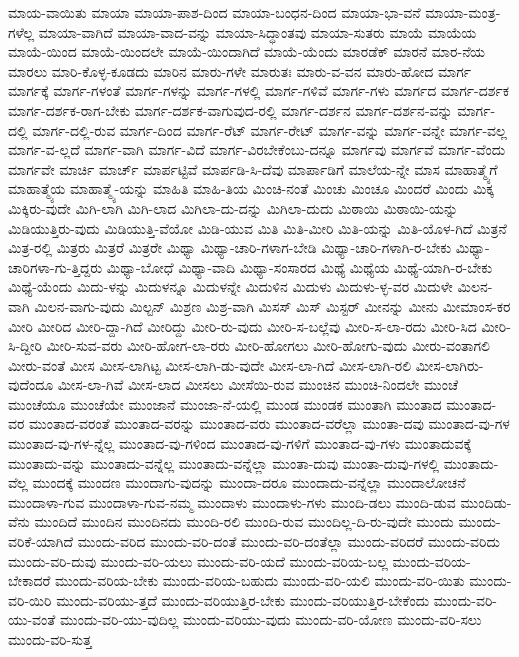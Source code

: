 {ಮಾಯ-ವಾಯಿತು
ಮಾಯಾ
ಮಾಯಾ-ಪಾಶ-ದಿಂದ
ಮಾಯಾ-ಬಂಧನ-ದಿಂದ
ಮಾಯಾ-ಭಾ-ವನೆ
ಮಾಯಾ-ಮಂತ್ರ-ಗಳೆಲ್ಲ
ಮಾಯಾ-ವಾಗಿದೆ
ಮಾಯಾ-ವಾದ-ವನ್ನು
ಮಾಯಾ-ಸಿದ್ಧಾಂತವು
ಮಾಯಾ-ಸುತರು
ಮಾಯೆ
ಮಾಯೆಯ
ಮಾಯೆ-ಯಿಂದ
ಮಾಯೆ-ಯಿಂದಲೇ
ಮಾಯೆ-ಯಿಂದಾಗಿದೆ
ಮಾಯೆ-ಯೆಂದು
ಮಾರಡೆಕ್
ಮಾರನೆ
ಮಾರ-ನೆಯ
ಮಾರಲು
ಮಾರಿ-ಕೊಳ್ಳ-ಕೂಡದು
ಮಾರಿನ
ಮಾರು-ಗಳೇ
ಮಾರುತಃ
ಮಾರು-ವ-ವನ
ಮಾರು-ಹೋದ
ಮಾರ್ಗ
ಮಾರ್ಗಕ್ಕೆ
ಮಾರ್ಗ-ಗಳಂತೆ
ಮಾರ್ಗ-ಗಳನ್ನು
ಮಾರ್ಗ-ಗಳಲ್ಲಿ
ಮಾರ್ಗ-ಗಳಿವೆ
ಮಾರ್ಗ-ಗಳು
ಮಾರ್ಗದ
ಮಾರ್ಗ-ದರ್ಶಕ
ಮಾರ್ಗ-ದರ್ಶಕ-ರಾಗ-ಬೇಕು
ಮಾರ್ಗ-ದರ್ಶಕ-ವಾಗುವುದ-ರಲ್ಲಿ
ಮಾರ್ಗ-ದರ್ಶನ
ಮಾರ್ಗ-ದರ್ಶನ-ವನ್ನು
ಮಾರ್ಗ-ದಲ್ಲಿ
ಮಾರ್ಗ-ದಲ್ಲಿ-ರುವ
ಮಾರ್ಗ-ದಿಂದ
ಮಾರ್ಗ-ರೆಟ್
ಮಾರ್ಗ-ರೇಟ್
ಮಾರ್ಗ-ವನ್ನು
ಮಾರ್ಗ-ವನ್ನೇ
ಮಾರ್ಗ-ವಲ್ಲ
ಮಾರ್ಗ-ವ-ಲ್ಲದೆ
ಮಾರ್ಗ-ವಾಗಿ
ಮಾರ್ಗ-ವಿದೆ
ಮಾರ್ಗ-ವಿರಬೇಕೆಂಬು-ದನ್ನೂ
ಮಾರ್ಗವು
ಮಾರ್ಗವೆ
ಮಾರ್ಗ-ವೆಂದು
ಮಾರ್ಗವೇ
ಮಾರ್ಚಿ
ಮಾರ್ಚ್
ಮಾರ್ಪಟ್ಟಿವೆ
ಮಾರ್ಪಡಿ-ಸಿ-ದೆವು
ಮಾರ್ಪಾಡಿಗೆ
ಮಾಲೆಯ-ನ್ನೇ
ಮಾಸ
ಮಾಹಾತ್ಮ್ಯೆಗೆ
ಮಾಹಾತ್ಮ್ಯೆಯ
ಮಾಹಾತ್ಮ್ಯೆ-ಯನ್ನು
ಮಾಹಿತಿ
ಮಾಹಿ-ತಿಯ
ಮಿಂಚಿ-ನಂತೆ
ಮಿಂಚು
ಮಿಂಚೂ
ಮಿಂದರೆ
ಮಿಂದು
ಮಿಕ್ಕ
ಮಿಕ್ಕಿರು-ವುದೇ
ಮಿಗಿ-ಲಾಗಿ
ಮಿಗಿ-ಲಾದ
ಮಿಗಿಲಾ-ದು-ದನ್ನು
ಮಿಗಿಲಾ-ದುದು
ಮಿಠಾಯಿ
ಮಿಠಾಯಿ-ಯನ್ನು
ಮಿಡಿಯುತ್ತಿರು-ವುದು
ಮಿಡಿಯುತ್ತಿ-ವೆಯೋ
ಮಿಡಿ-ಯುವ
ಮಿತಿ
ಮಿತಿ-ಮೀರಿ
ಮಿತಿ-ಯನ್ನು
ಮಿತಿ-ಯೊಳ-ಗಿದೆ
ಮಿತ್ರನೆ
ಮಿತ್ರ-ರಲ್ಲಿ
ಮಿತ್ರರು
ಮಿತ್ರರೆ
ಮಿತ್ರರೇ
ಮಿಥ್ಯಾ
ಮಿಥ್ಯಾ-ಚಾರಿ-ಗಳಾಗ-ಬೇಡಿ
ಮಿಥ್ಯಾ-ಚಾರಿ-ಗಳಾಗಿ-ರ-ಬೇಕು
ಮಿಥ್ಯಾ-ಚಾರಿಗಳಾ-ಗು-ತ್ತಿದ್ದರು
ಮಿಥ್ಯಾ-ಬೋಧೆ
ಮಿಥ್ಯಾ-ವಾದಿ
ಮಿಥ್ಯಾ-ಸಂಸಾರದ
ಮಿಥ್ಯೆ
ಮಿಥ್ಯೆಯ
ಮಿಥ್ಯೆ-ಯಾಗಿ-ರ-ಬೇಕು
ಮಿಥ್ಯೆ-ಯೆಂದು
ಮಿದು-ಳನ್ನು
ಮಿದುಳನ್ನೂ
ಮಿದುಳನ್ನೇ
ಮಿದುಳಿನ
ಮಿದುಳು
ಮಿದುಳು-ಳ್ಳ-ವರ
ಮಿದುಳೇ
ಮಿಲನ-ವಾಗಿ
ಮಿಲನ-ವಾಗು-ವುದು
ಮಿಲ್ಟನ್
ಮಿಶ್ರಣ
ಮಿಶ್ರ-ವಾಗಿ
ಮಿಸಸ್
ಮಿಸ್
ಮಿಸ್ಟರ್
ಮೀನನ್ನು
ಮೀನು
ಮೀಮಾಂಸ-ಕರ
ಮೀರಿ
ಮೀರಿದ
ಮೀರಿ-ದ್ದಾ-ಗಿದೆ
ಮೀರಿದ್ದು
ಮೀರಿ-ರು-ವುದು
ಮೀರಿ-ಸ-ಬಲ್ಲೆವು
ಮೀರಿ-ಸ-ಲಾ-ರದು
ಮೀರಿ-ಸಿದ
ಮೀರಿ-ಸಿ-ದ್ದೀರಿ
ಮೀರಿ-ಸುವ-ವರು
ಮೀರಿ-ಹೋಗ-ಲಾ-ರರು
ಮೀರಿ-ಹೋಗಲು
ಮೀರಿ-ಹೋಗು-ವುದು
ಮೀರು-ವಂತಾಗಲಿ
ಮೀರು-ವಂತೆ
ಮೀಸ
ಮೀಸ-ಲಾಗಿಟ್ಟ
ಮೀಸ-ಲಾಗಿ-ಡು-ವುದೇ
ಮೀಸ-ಲಾ-ಗಿದೆ
ಮೀಸ-ಲಾಗಿ-ರಲಿ
ಮೀಸ-ಲಾಗಿರು-ವುದೆಂದೂ
ಮೀಸ-ಲಾ-ಗಿವೆ
ಮೀಸ-ಲಾದ
ಮೀಸಲು
ಮೀಸೆಯಿ-ರುವ
ಮುಂಚಿನ
ಮುಂಚಿ-ನಿಂದಲೇ
ಮುಂಚೆ
ಮುಂಚೆಯೂ
ಮುಂಚೆಯೇ
ಮುಂಜಾನೆ
ಮುಂಜಾ-ನೆ-ಯಲ್ಲಿ
ಮುಂಡ
ಮುಂಡಕ
ಮುಂತಾಗಿ
ಮುಂತಾದ
ಮುಂತಾದ-ವರ
ಮುಂತಾದ-ವರಂತೆ
ಮುಂತಾದ-ವರನ್ನು
ಮುಂತಾದ-ವರು
ಮುಂತಾದ-ವರೆಲ್ಲಾ
ಮುಂತಾ-ದವು
ಮುಂತಾದ-ವು-ಗಳ
ಮುಂತಾದ-ವು-ಗಳ-ನ್ನೆಲ್ಲ
ಮುಂತಾದ-ವು-ಗಳಿಂದ
ಮುಂತಾದ-ವು-ಗಳಿಗೆ
ಮುಂತಾದ-ವು-ಗಳು
ಮುಂತಾದುವಕ್ಕೆ
ಮುಂತಾದು-ವನ್ನು
ಮುಂತಾದು-ವನ್ನೆಲ್ಲ
ಮುಂತಾದು-ವನ್ನೆಲ್ಲಾ
ಮುಂತಾ-ದುವು
ಮುಂತಾ-ದುವು-ಗಳಲ್ಲಿ
ಮುಂತಾದು-ವೆಲ್ಲ
ಮುಂದಕ್ಕೆ
ಮುಂದಣ
ಮುಂದಾಗು-ವುದನ್ನು
ಮುಂದಾ-ದರೂ
ಮುಂದಾದು-ವನ್ನೆಲ್ಲಾ
ಮುಂದಾಲೋಚನೆ
ಮುಂದಾಳಾ-ಗುವ
ಮುಂದಾಳಾ-ಗುವ-ನಮ್ಮ
ಮುಂದಾಳು
ಮುಂದಾಳು-ಗಳು
ಮುಂದಿ-ಡಲು
ಮುಂದಿ-ಡುವ
ಮುಂದಿಡು-ವೆನು
ಮುಂದಿದೆ
ಮುಂದಿನ
ಮುಂದಿನದು
ಮುಂದಿ-ರಲಿ
ಮುಂದಿ-ರುವ
ಮುಂದಿಲ್ಲ-ದಿ-ರು-ವುದೇ
ಮುಂದು
ಮುಂದು-ವರಿಕೆ-ಯಾಗಿದೆ
ಮುಂದು-ವರಿದ
ಮುಂದು-ವರಿ-ದಂತೆ
ಮುಂದು-ವರಿ-ದಂತೆಲ್ಲಾ
ಮುಂದು-ವರಿದರೆ
ಮುಂದು-ವರಿದು
ಮುಂದು-ವರಿ-ದುವು
ಮುಂದು-ವರಿ-ಯಲು
ಮುಂದು-ವರಿ-ಯದೆ
ಮುಂದು-ವರಿಯ-ಬಲ್ಲ
ಮುಂದು-ವರಿಯ-ಬೇಕಾದರೆ
ಮುಂದು-ವರಿಯ-ಬೇಕು
ಮುಂದು-ವರಿಯ-ಬಹುದು
ಮುಂದು-ವರಿ-ಯಲಿ
ಮುಂದು-ವರಿ-ಯಿತು
ಮುಂದು-ವರಿ-ಯಿರಿ
ಮುಂದು-ವರಿಯು-ತ್ತದೆ
ಮುಂದು-ವರಿಯುತ್ತಿರ-ಬೇಕು
ಮುಂದು-ವರಿಯುತ್ತಿರ-ಬೇಕೆಂದು
ಮುಂದು-ವರಿ-ಯು-ವಂತೆ
ಮುಂದು-ವರಿ-ಯು-ವುದಿಲ್ಲ
ಮುಂದು-ವರಿಯು-ವುದು
ಮುಂದು-ವರಿ-ಯೋಣ
ಮುಂದು-ವರಿ-ಸಲು
ಮುಂದು-ವರಿ-ಸುತ್ತ
}
